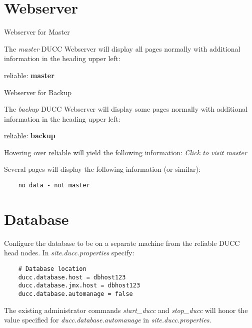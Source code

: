 \section{Webserver}

	Webserver for Master

	The {\em master} DUCC Webserver will display all pages normally with additional
	information in the heading upper left:
	
	reliable: \textbf{master}
   	
	Webserver for Backup
	
	The {\em backup} DUCC Webserver will display some pages normally with additional
	information in the heading upper left:
	
	\underline{reliable}: \textbf{backup}
   	
   	Hovering over \underline{reliable} will yield the following information:
   	{\em Click to visit master}
   	
   	Several pages will display the following information (or similar):
   	
   	\begin{verbatim}
	no data - not master
   	\end{verbatim}

\section{Database}

	Configure the database to be on a separate machine from the reliable DUCC head nodes.
	In {\em site.ducc.properties} specify:
	
	\begin{verbatim}
	# Database location
    ducc.database.host = dbhost123
    ducc.database.jmx.host = dbhost123
    ducc.database.automanage = false
   	\end{verbatim}
   	
   	The existing administrator commands {\em start\_ducc} and {\em stop\_ducc} will
   	honor the value specified for {\em ducc.database.automanage} in {\em site.ducc.properties}.

